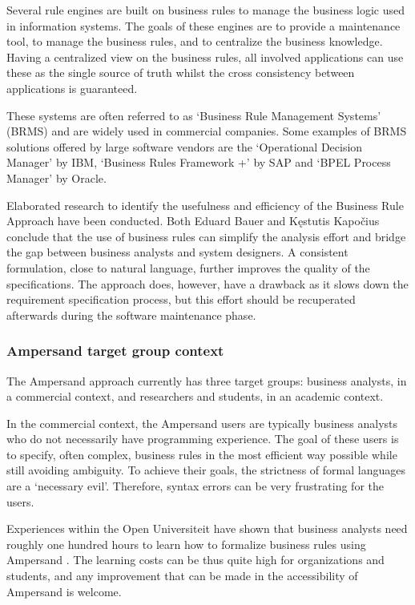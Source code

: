 Several rule engines are built on business rules to manage the business logic used in information systems. 
The goals of these engines are to provide a maintenance tool, to manage the business rules, and to centralize the business knowledge.
Having a centralized view on the business rules, all involved  applications can use these as the single source of truth whilst the cross consistency between applications is guaranteed.

%
These systems are often referred to as `Business Rule Management Systems' (BRMS) and are widely used in commercial companies.
%
Some examples of BRMS solutions offered by large software vendors are the `Operational Decision Manager' by IBM, `Business Rules Framework +' by SAP and `BPEL Process Manager' by Oracle.

Elaborated research to identify the usefulness and efficiency of the Business Rule Approach have been conducted.
Both Eduard Bauer  and Kęstutis Kapočius  conclude that the use of business rules can simplify the analysis effort and bridge the gap between business analysts and system designers. 
A consistent formulation, close to natural language, further improves the quality of the specifications.
The approach does, however, have a drawback as it slows down the requirement specification process, but this effort should be recuperated afterwards during the software maintenance phase.

\subsubsection{Ampersand target group context}
The Ampersand approach currently has three target groups: business analysts, in a commercial context, and researchers and students, in an academic context.

In the commercial context, the Ampersand users are typically business analysts who do not necessarily have programming experience.
The goal of these users is to specify, often complex, business rules in the most efficient way possible while still avoiding ambiguity.
To achieve their goals, the strictness of formal languages are a `necessary evil'.
Therefore, syntax errors can be very frustrating for the users.

Experiences within the Open Universiteit have shown that business analysts need roughly one hundred hours to learn how to formalize business rules using Ampersand .
The learning costs can be thus quite high for organizations and students, and any improvement that can be made in the accessibility of Ampersand is welcome.

